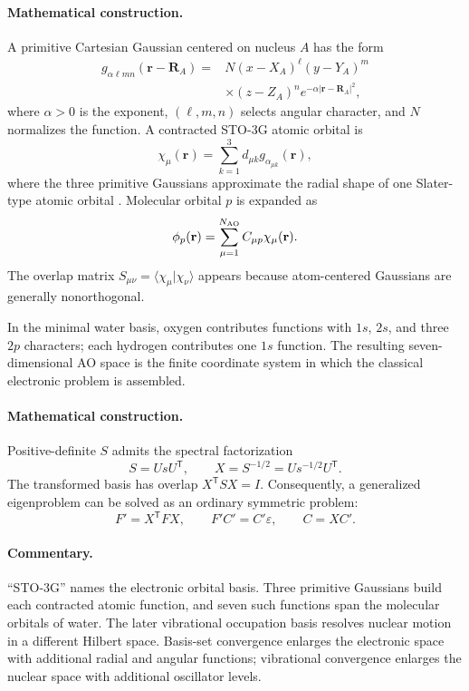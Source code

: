 \documentclass[10pt,twocolumn]{article}
\newcommand{\mathderiv}{\paragraph{Mathematical construction.}}
\newcommand{\commentaryblock}{\paragraph{Commentary.}}
\begin{document}
\mathderiv A primitive Cartesian Gaussian centered on nucleus $A$ has the form
\begin{align}
g_{\alpha\ell mn}(\mathbf r-\mathbf R_A)
={}&N(x-X_A)^\ell(y-Y_A)^m\nonumber\\
&\times(z-Z_A)^n e^{-\alpha|\mathbf r-\mathbf R_A|^2},
\label{eq:primitive-gaussian}
\end{align}
where $\alpha>0$ is the exponent, $(\ell,m,n)$ selects angular character, and
$N$ normalizes the function.  A contracted STO-3G atomic orbital is
\begin{equation}
\chi_\mu(\mathbf r)=\sum_{k=1}^{3}d_{\mu k}g_{\alpha_{\mu k}}(\mathbf r),
\label{eq:sto3g}
\end{equation}
where the three primitive Gaussians approximate the radial shape of one
Slater-type atomic orbital \cite{STO3G}.  Molecular orbital $p$ is expanded as
\begin{equation}
\phi_p(\mathbf r)=\sum_{\mu=1}^{N_{\rm AO}}C_{\mu p}\chi_\mu(\mathbf r).
\label{eq:lcaomo}
\end{equation}
The overlap matrix $S_{\mu\nu}=\langle\chi_\mu|\chi_\nu\rangle$ appears because
atom-centered Gaussians are generally nonorthogonal.

In the minimal water basis, oxygen contributes functions with $1s$, $2s$, and
three $2p$ characters; each hydrogen contributes one $1s$ function.  The
resulting seven-dimensional AO space is the finite coordinate system in which
the classical electronic problem is assembled.

\mathderiv Positive-definite $S$ admits the spectral factorization
\begin{equation}
S=U s U^{\mathsf T},\qquad
X=S^{-1/2}=U s^{-1/2}U^{\mathsf T}.
\label{eq:symmetric-orthogonalization}
\end{equation}
The transformed basis has overlap $X^{\mathsf T}SX=I$.  Consequently, a
generalized eigenproblem can be solved as an ordinary symmetric problem:
\begin{equation}
F'=X^{\mathsf T}FX,\qquad
F'C'=C'\varepsilon,\qquad C=XC'.
\label{eq:orthogonalized-fock}
\end{equation}

\commentaryblock ``STO-3G'' names the electronic orbital basis.  Three
primitive Gaussians build each contracted atomic function, and seven such
functions span the molecular orbitals of water.  The later vibrational
occupation basis resolves nuclear motion in a different Hilbert space.
Basis-set convergence enlarges the electronic space with additional radial and
angular functions; vibrational convergence enlarges the nuclear space with
additional oscillator levels.
\end{document}
